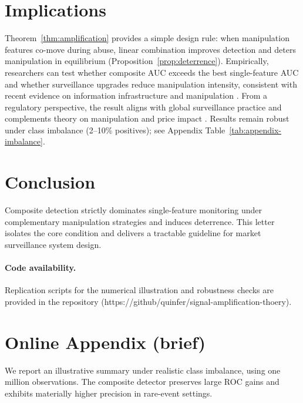 \documentclass[preprint,12pt,authoryear]{elsarticle}
\begin{document}
\section{Implications}
Theorem~\ref{thm:amplification} provides a simple design rule: when manipulation features co-move during abuse, linear combination improves detection and deters manipulation in equilibrium (Proposition~\ref{prop:deterrence}). Empirically, researchers can test whether composite AUC exceeds the best single-feature AUC and whether surveillance upgrades reduce manipulation intensity, consistent with recent evidence on information infrastructure and manipulation \citep{liu2024asset,xiong2024information,wang2024information}. From a regulatory perspective, the result aligns with global surveillance practice \citep{cumming2008global} and complements theory on manipulation and price impact \citep{huberman2004price}. Results remain robust under class imbalance (2--10\% positives); see Appendix Table~\ref{tab:appendix-imbalance}.

\section{Conclusion}
Composite detection strictly dominates single-feature monitoring under complementary manipulation strategies and induces deterrence. This letter isolates the core condition and delivers a tractable guideline for market surveillance system design.

\paragraph{Code availability.} Replication scripts for the numerical illustration and robustness checks are provided in the repository (https://github/quinfer/signal-amplification-thoery).

\section*{Online Appendix (brief)}
We report an illustrative summary under realistic class imbalance, using one million observations. The composite detector preserves large ROC gains and exhibits materially higher precision in rare-event settings.
\end{document}
